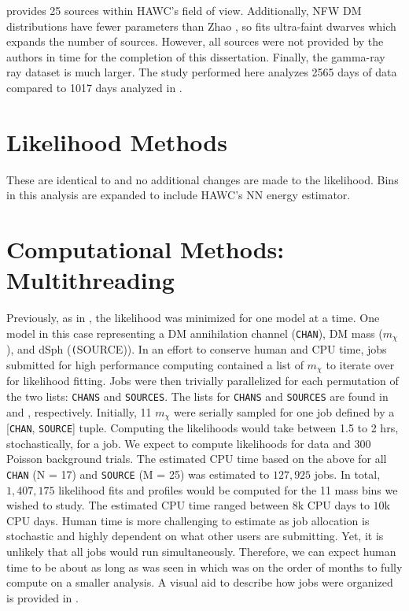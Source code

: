 \LS provides 25 sources within HAWC's field of view.
Additionally, NFW \cite{NFWProfile} DM distributions have fewer parameters than Zhao \cite{Zhao:1995cp}, so \LS fits ultra-faint dwarves which expands the number of sources.
However, all sources were not provided by the authors in time for the completion of this dissertation.
Finally, the gamma-ray ray dataset is much larger.
The study performed here analyzes 2565 days of data compared to 1017 days analyzed in .

\section{Likelihood Methods} \label{sec:mtd_ll_methods}

These are identical to  and no additional changes are made to the likelihood.
Bins in this analysis are expanded to include HAWC's NN energy estimator.

\section{Computational Methods: Multithreading} \label{sec:mtd_comp_methods}

Previously, as in , the likelihood was minimized for one model at a time.
One model in this case representing a DM annihilation channel (\texttt{CHAN}), DM mass ($m_\chi$), and dSph (\texttt(SOURCE)).
In an effort to conserve human and CPU time, jobs submitted for high performance computing contained a list of $m_\chi$ to iterate over for likelihood fitting.
Jobs were then trivially parallelized for each permutation of the two lists: \texttt{CHANS} and \texttt{SOURCES}.
The lists for \texttt{CHANS} and \texttt{SOURCES} are found in  and , respectively.
Initially, 11 $m_\chi$ were serially sampled for one job defined by a [\texttt{CHAN}, \texttt{SOURCE}] tuple.
Computing the likelihoods would take between 1.5 to 2 hrs, stochastically, for a job.
We expect to compute likelihoods for data and 300 Poisson background trials.
The estimated CPU time based on the above for all \texttt{CHAN} (N = 17) and \texttt{SOURCE} (M = 25) was estimated to $127,925$ jobs.
In total, $1,407,175$ likelihood fits and profiles would be computed for the 11 mass bins we wished to study.
The estimated CPU time ranged between $8$k CPU days to $10$k CPU days.
Human time is more challenging to estimate as job allocation is stochastic and highly dependent on what other users are submitting.
Yet, it is unlikely that all jobs would run simultaneously.
Therefore, we can expect human time to be about as long as was seen in  which was on the order of months to fully compute on a smaller analysis.
A visual aid to describe how jobs were organized is provided in .

